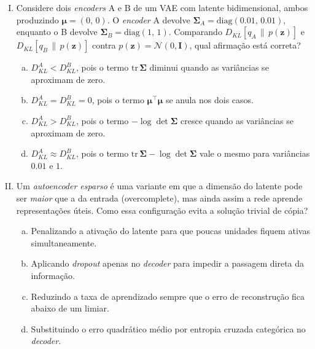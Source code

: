 \documentclass{dlproblemset}
\begin{document}
\begin{enumerate}[I)]
    \item {} Considere dois \textit{encoders} A e B de um VAE com latente bidimensional, ambos produzindo $\boldsymbol{\mu} = (0,\, 0)$. O \textit{encoder} A devolve $\boldsymbol{\Sigma}_A = \mathrm{diag}(0.01,\, 0.01)$, enquanto o B devolve $\boldsymbol{\Sigma}_B = \mathrm{diag}(1,\, 1)$. Comparando $D_{KL}\!\left[q_A \,\|\, p(\mathbf{z})\right]$ e $D_{KL}\!\left[q_B \,\|\, p(\mathbf{z})\right]$ contra $p(\mathbf{z}) = \mathcal{N}(0, \mathbf{I})$, qual afirmação está correta?
    \begin{enumerate}[(a)]
        \item $D_{KL}^{A} < D_{KL}^{B}$, pois o termo $\mathrm{tr}\,\boldsymbol{\Sigma}$ diminui quando as variâncias se aproximam de zero.
        \item $D_{KL}^{A} = D_{KL}^{B} = 0$, pois o termo $\boldsymbol{\mu}^{\top}\boldsymbol{\mu}$ se anula nos dois casos.
        \item $D_{KL}^{A} > D_{KL}^{B}$, pois o termo $-\log\det\boldsymbol{\Sigma}$ cresce quando as variâncias se aproximam de zero.
        \item $D_{KL}^{A} \approx D_{KL}^{B}$, pois o termo $\mathrm{tr}\,\boldsymbol{\Sigma} - \log\det\boldsymbol{\Sigma}$ vale o mesmo para variâncias $0.01$ e $1$.
    \end{enumerate}

    \item Um \textit{autoencoder esparso} é uma variante em que a dimensão do latente pode ser \emph{maior} que a da entrada (overcomplete), mas ainda assim a rede aprende representações úteis. Como essa configuração evita a solução trivial de cópia?
    \begin{enumerate}[(a)]
        \item Penalizando a ativação do latente para que poucas unidades fiquem ativas simultaneamente.
        \item Aplicando \textit{dropout} apenas no \textit{decoder} para impedir a passagem direta da informação.
        \item Reduzindo a taxa de aprendizado sempre que o erro de reconstrução fica abaixo de um limiar.
        \item Substituindo o erro quadrático médio por entropia cruzada categórica no \textit{decoder}.
    \end{enumerate}



\end{enumerate}
\end{document}
